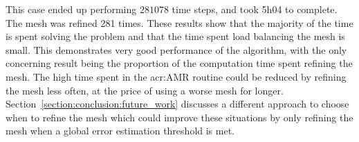 This case ended up performing \(281078\) time steps, and took 5h04 to complete. The mesh was refined
281 times. These results show that the majority of the time is spent solving the problem and that
the time spent load balancing the mesh is small. This demonstrates very good performance of the
algorithm, with the only concerning result being the proportion of the computation time spent
refining the mesh. The high time spent in the \acrshort{acr:AMR} routine could be reduced by
refining the mesh less often, at the price of using a worse mesh for longer.
Section~\ref{section:conclusion:future_work} discusses a different approach to choose when to refine
the mesh which could improve these situations by only refining the mesh when a global error
estimation threshold is met.
